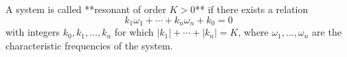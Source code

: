 A system is called **resonant of order $K > 0$** if there exists a relation
$$k_1 \omega_1 + \cdots + k_n \omega_n + k_0 = 0$$
with integers $k_0, k_1, \ldots, k_n$ for which $|k_1| + \cdots + |k_n| = K$, where $\omega_1, \ldots, \omega_n$ are the characteristic frequencies of the system.
